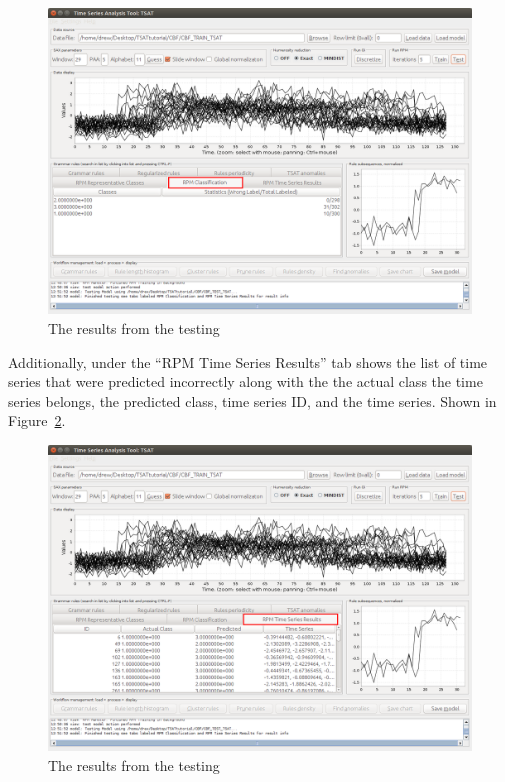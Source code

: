 \documentclass[titlepage, letterpaper, 12pt]{article}
\begin{document}
\begin{figure}[H]
	\includegraphics[width=\textwidth]{TSAT-testing-step-2}
	\caption{The results from the testing}
	\label{fig:TSAT-testing-step-2}
\end{figure}

Additionally, under the ``RPM Time Series Results'' tab shows the list of time series that were predicted incorrectly along with the the actual class the time series belongs, the predicted class, time series ID, and the time series.  Shown in Figure~\ref{fig:TSAT-testing-step-3}.

\begin{figure}[H]
	\includegraphics[width=\textwidth]{TSAT-testing-step-3}
	\caption{The results from the testing}
	\label{fig:TSAT-testing-step-3}
\end{figure}
\end{document}
